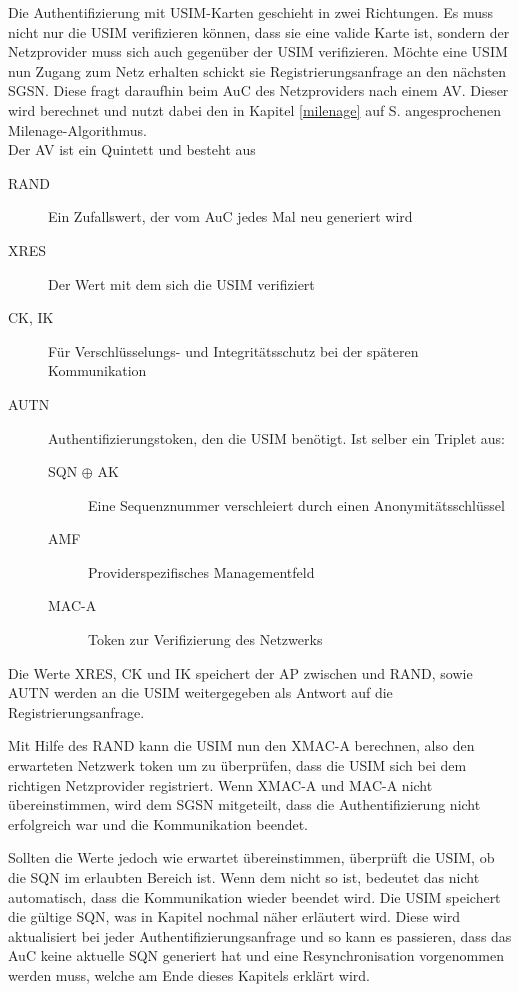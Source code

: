  Die Authentifizierung mit \ac{USIM}-Karten geschieht in zwei Richtungen. Es muss nicht nur die
 USIM verifizieren können, dass sie eine valide Karte ist, sondern der Netzprovider muss sich auch
 gegenüber der USIM verifizieren. Möchte eine USIM nun Zugang zum Netz erhalten schickt sie
 Registrierungsanfrage an den nächsten \ac{SGSN}. Diese fragt daraufhin beim \ac{AuC} des
 Netzproviders nach einem \ac{AV}. Dieser wird berechnet und nutzt dabei den in Kapitel
 \ref{milenage} auf S. \pageref{milenage} angesprochenen Milenage-Algorithmus. \\
 Der AV ist ein Quintett und besteht aus
 
 \begin{description}
  \item [RAND] Ein Zufallswert, der vom AuC jedes Mal neu generiert wird
  \item [XRES] Der Wert mit dem sich die USIM verifiziert
  \item [CK, IK] Für Verschlüsselungs- und Integritätsschutz bei der späteren Kommunikation
  \item [AUTN] Authentifizierungstoken, den die USIM benötigt. Ist selber ein Triplet aus:
  \begin{description}
   \item [SQN $\oplus$ AK] Eine Sequenznummer verschleiert durch einen Anonymitätsschlüssel
   \item [AMF] Providerspezifisches Managementfeld
   \item [MAC-A] Token zur Verifizierung des Netzwerks
  \end{description}
 \end{description}
 
 Die Werte XRES, CK und IK speichert der AP zwischen und RAND, sowie AUTN werden an die USIM
 weitergegeben als Antwort auf die Registrierungsanfrage.

 Mit Hilfe des RAND kann die USIM nun den XMAC-A berechnen, also den erwarteten Netzwerk\-
 token um zu überprüfen, dass die USIM sich bei dem richtigen Netzprovider registriert. Wenn XMAC-A
 und MAC-A nicht übereinstimmen, wird dem SGSN mitgeteilt, dass die Authentifizierung nicht erfolgreich
 war und die Kommunikation beendet.

 Sollten die Werte jedoch wie erwartet übereinstimmen, überprüft die USIM, ob die SQN im erlaubten
 Bereich ist. Wenn dem nicht so ist, bedeutet das nicht automatisch, dass die Kommunikation wieder
 beendet wird. Die USIM speichert die gültige SQN, was in Kapitel 
 nochmal näher erläutert wird. Diese wird aktualisiert bei jeder Authentifizierungsanfrage und so kann
 es passieren, dass das AuC keine aktuelle SQN generiert hat und eine Resynchronisation vorgenommen
 werden muss, welche am Ende dieses Kapitels erklärt wird.
 
